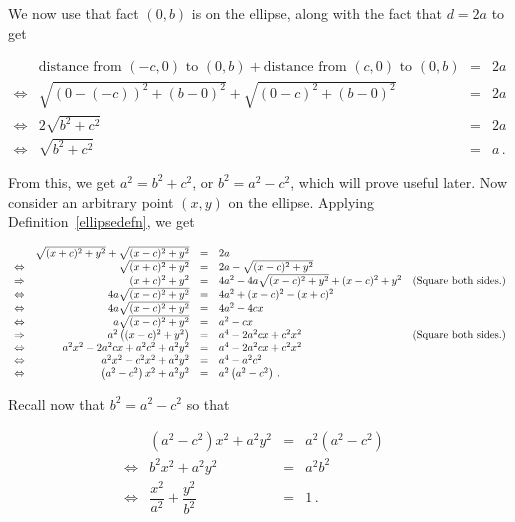  We now use that fact $(0,b)$ is on the ellipse, along with the fact that $d=2a$ to get

\[ \begin{array}{rrcl} &\mbox{distance from  $(-c,0)$ to $(0,b)$} + \mbox{distance from $(c,0)$ to $(0,b)$} & = & 2a  \\ \Leftrightarrow&\sqrt{(0-(-c))^2+(b-0)^2} + \sqrt{(0-c)^2+(b-0)^2} & = & 2a   \\ 
\Leftrightarrow&2 \sqrt{b^2+c^2} & = & 2a \\ 
\Leftrightarrow&\sqrt{b^2+c^2} & = & a\,. \end{array}\]


From this, we get $a^2 = b^2 + c^2$, or $b^2 = a^2 - c^2$, which will prove useful later.  Now consider an arbitrary point $(x,y)$ on the ellipse.  Applying Definition~\ref{ellipsedefn}, we get


\[\allowdisplaybreaks \begin{array}{rrclr}  
&\sqrt{(x+c)^2+y^2}+\sqrt{(x-c)^2+y^2} & = & 2a  & \\ 
\Leftrightarrow&\sqrt{(x+c)^2+y^2} & = & 2a - \sqrt{(x-c)^2+y^2} & \\ 
\Rightarrow&(x+c)^2+y^2 & = & 4a^2 - 4a\sqrt{(x-c)^2+y^2} + (x-c)^2+y^2 & \mbox{(Square both sides.)}\\ 
\Leftrightarrow&4a\sqrt{(x-c)^2+y^2} & = & 4a^2 + (x-c)^2 - (x+c)^2 & \\ 
\Leftrightarrow&4a\sqrt{(x-c)^2+y^2} & = & 4a^2 - 4cx & \\ 
\Leftrightarrow&a\sqrt{(x-c)^2+y^2} & = & a^2 - cx & \\ 
\Rightarrow&a^2\left((x-c)^2+y^2\right) & = & a^4 - 2a^2cx +c^2 x^2 & \mbox{(Square both sides.)}\\  
\Leftrightarrow&a^2x^2 - 2a^2cx + a^2c^2+a^2 y^2 & = & a^4 - 2a^2cx +c^2 x^2 & \\  
\Leftrightarrow&a^2x^2 - c^2 x^2 +a^2 y^2 & = & a^4  - a^2c^2 & \\ 
\Leftrightarrow&\left(a^2 - c^2\right) x^2 +a^2 y^2 & = & a^2 \left(a^2 - c^2\right)\,.  & \\ \end{array}\]

Recall now that $b^2 = a^2 - c^2$ so that

\[ \begin{array}{rrclr} 
&\left(a^2 - c^2\right)x^2 +a^2 y^2 & = & a^2\left(a^2 - c^2\right) & \\ 
\Leftrightarrow&b^2 x^2 +a^2 y^2 & = & a^2 b^2 & \\  
\Leftrightarrow&\dfrac{x^2}{a^2} + \dfrac{y^2}{b^2} & = & 1\,. &  \\ \end{array}\]

